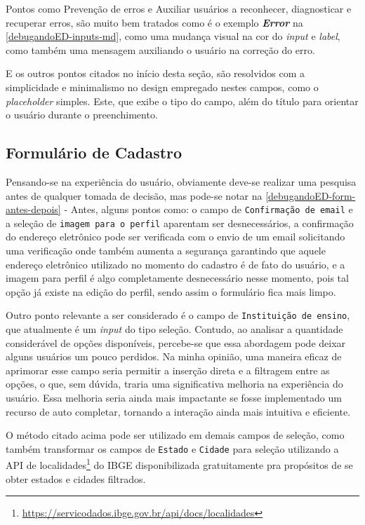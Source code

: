 Pontos como Prevenção de erros e Auxiliar usuários a reconhecer, diagnosticar e recuperar erros, são muito bem tratados como é o exemplo \textbf{\textit{Error}} na \autoref{debugandoED-inputs-md}, como uma mudança visual na cor do \textit{input} e \textit{label}, como também uma mensagem auxiliando o usuário na correção do erro.

E os outros pontos citados no início desta seção, são resolvidos com a simplicidade e minimalismo no design empregado nestes campos, como o \textit{placeholder} simples. Este, que exibe o tipo do campo,  além do título para orientar o usuário durante o preenchimento.

\subsection{Formulário de Cadastro}
\label{Formulário de Cadastro}

Pensando-se na experiência do usuário, obviamente deve-se realizar uma pesquisa antes de qualquer tomada de decisão, mas pode-se notar na \autoref{debugandoED-form-antes-depois} - Antes, alguns pontos como: o campo de \texttt{Confirmação de email} e a seleção de \texttt{imagem para o perfil} aparentam ser desnecessários, a confirmação do endereço eletrônico pode ser verificada com o envio de um email solicitando uma verificação onde também aumenta a segurança garantindo que aquele endereço eletrônico utilizado no momento do cadastro é de fato do usuário, e a imagem para perfil é algo completamente desnecessário nesse momento, pois tal opção já existe na edição do perfil, sendo assim o formulário fica mais limpo.

Outro ponto relevante a ser considerado é o campo de \texttt{Instituição de ensino}, que atualmente é um \textit{input} do tipo seleção. Contudo, ao analisar a quantidade considerável de opções disponíveis, percebe-se que essa abordagem pode deixar alguns usuários um pouco perdidos. Na minha opinião, uma maneira eficaz de aprimorar esse campo seria permitir a inserção direta e a filtragem entre as opções, o que, sem dúvida, traria uma significativa melhoria na experiência do usuário. Essa melhoria seria ainda mais impactante se fosse implementado um recurso de auto completar, tornando a interação ainda mais intuitiva e eficiente.

O método citado acima pode ser utilizado em demais campos de seleção, como também transformar os campos de \texttt{Estado} e \texttt{Cidade} para seleção utilizando a \ac{API} de  localidades\footnote{\url{https://servicodados.ibge.gov.br/api/docs/localidades}} do IBGE disponibilizada gratuitamente pra propósitos de se obter estados e cidades filtrados.

